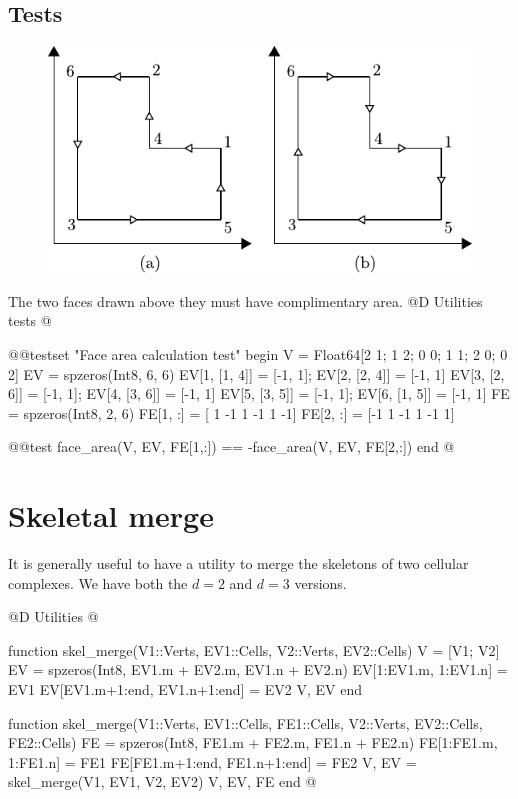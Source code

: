 \subsection{Tests}
\begin{figure}[h]
    \centering
    \includegraphics{./img/ch5-area_test.pdf}
\end{figure}
\noindent The two faces drawn above they must have complimentary area.
@D Utilities tests
@{@@testset "Face area calculation test" begin
    V = Float64[2 1; 1 2; 0 0; 1 1; 2 0; 0 2]
    EV = spzeros(Int8, 6, 6)
    EV[1, [1, 4]] = [-1, 1]; EV[2, [2, 4]] = [-1, 1]
    EV[3, [2, 6]] = [-1, 1]; EV[4, [3, 6]] = [-1, 1]
    EV[5, [3, 5]] = [-1, 1]; EV[6, [1, 5]] = [-1, 1]
    FE = spzeros(Int8, 2, 6)
    FE[1, :] = [ 1 -1  1 -1  1 -1]
    FE[2, :] = [-1  1 -1  1 -1  1]

    @@test face_area(V, EV, FE[1,:]) == -face_area(V, EV, FE[2,:])
end
@}

\section{Skeletal merge}

It is generally useful to have a utility to merge the skeletons of
two cellular complexes. We have both the $d=2$ and $d=3$ versions.

@D Utilities
@{function skel_merge(V1::Verts, EV1::Cells, V2::Verts, EV2::Cells)
    V = [V1; V2]
    EV = spzeros(Int8, EV1.m + EV2.m, EV1.n + EV2.n)
    EV[1:EV1.m, 1:EV1.n] = EV1
    EV[EV1.m+1:end, EV1.n+1:end] = EV2
    V, EV
end

function skel_merge(V1::Verts, EV1::Cells, FE1::Cells, V2::Verts, EV2::Cells, FE2::Cells)
    FE = spzeros(Int8, FE1.m + FE2.m, FE1.n + FE2.n)
    FE[1:FE1.m, 1:FE1.n] = FE1
    FE[FE1.m+1:end, FE1.n+1:end] = FE2
    V, EV = skel_merge(V1, EV1, V2, EV2)
    V, EV, FE
end
@}

